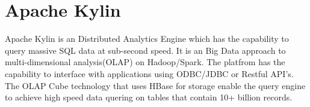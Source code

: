 \section{Apache Kylin}
Apache Kylin is an Distributed Analytics Engine which has the capability to
query massive SQL data at sub-second speed. It is an Big Data approach to
multi-dimensional analysis(OLAP) on Hadoop/Spark. The platfrom has the
capability to interface with applications using ODBC/JDBC or Restful API's.
The OLAP Cube technology that uses HBase for storage enable the query engine
to achieve high speed data quering on tables that contain 10+ billion records.
